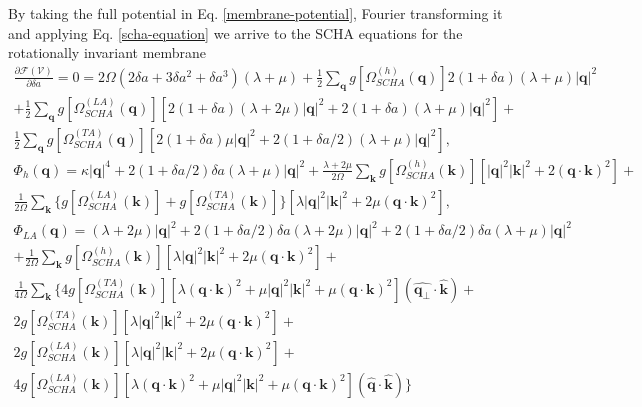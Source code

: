 By taking the full potential in Eq. \ref{membrane-potential}, Fourier transforming it and applying 
Eq. \ref{scha-equation} we arrive to the SCHA equations for the rotationally invariant membrane
\begin{multline}
 \frac{\partial\mathcal{F}(\mathcal{V})}{\partial\delta a}=0=2\Omega(2\delta a+3\delta a^{2}+\delta a^{3})(\lambda+
\mu)+\frac{1}{2}\sum_{\boldsymbol{q}}g[\Omega_{SCHA}^{(h)}(\boldsymbol{q})]2(1+\delta a)(\lambda+\mu)|\boldsymbol{
 q}|^{2}\\+\frac{1}{2}\sum_{\boldsymbol{q}}g[\Omega_{SCHA}^{(LA)}(\boldsymbol{q})][2(1+\delta a)(\lambda+2\mu)|\boldsymbol{q}|^{2}+2(1+\delta a)(\lambda+\mu)|\boldsymbol{q}|^{2}]+\\\frac{1}{2}\sum_{\boldsymbol{q}}g[\Omega_{
 SCHA}^{(TA)}(\boldsymbol{q})][2(1+\delta a)\mu|\boldsymbol{q}|^{2}+2(1+\delta a/2)(\lambda+\mu)|\boldsymbol{q}|^{2}],
\end{multline}
\begin{multline}
 \Phi_{h}(\boldsymbol{q})=\kappa|\boldsymbol{q}|^{4}+2(1+\delta a/2)\delta a(\lambda+\mu)|\boldsymbol{q}|^{2}+\frac{\lambda+2\mu}{2\Omega}\sum_{\boldsymbol{k}}g[\Omega_{SCHA}^{(h)}(\boldsymbol{k})][|\boldsymbol{q}|^{2}|\boldsymbol{
 k}|^{2}+2(\boldsymbol{q}\cdot\boldsymbol{k})^{2}]+\\\frac{1}{2\Omega}\sum_{\boldsymbol{k}}\{g[\Omega_{SCHA}^{(LA)}(\boldsymbol{k})]+g[\Omega_{SCHA}^{(TA)}(\boldsymbol{k})]\}[\lambda|\boldsymbol{q}|^{2}|\boldsymbol{k}|^{2}+2\mu(
 \boldsymbol{q}\cdot\boldsymbol{k})^{2}],
\end{multline}
\begin{multline}
 \Phi_{LA}(\boldsymbol{q})=(\lambda+2\mu)|\boldsymbol{q}|^{2}+2(1+\delta a/2)\delta a(\lambda+2\mu)|\boldsymbol{q}|^{2}+2(1+\delta a/2)\delta a(\lambda+\mu)|\boldsymbol{q}|^{2}\\+\frac{1}{2\Omega}\sum_{\boldsymbol{k}}g[\Omega_{SCHA}^{
 (h)}(\boldsymbol{k})][\lambda|\boldsymbol{q}|^{2}|\boldsymbol{k}|^{2}+2\mu(\boldsymbol{q}\cdot\boldsymbol{k})^{2}]+\\\frac{1}{4\Omega}\sum_{\boldsymbol{k}}\{4g[\Omega_{SCHA}^{(TA)}(\boldsymbol{k})][\lambda(\boldsymbol{q}\cdot\boldsymbol{
 k})^{2}+\mu|\boldsymbol{q}|^{2}|\boldsymbol{k}|^{2}+\mu(\boldsymbol{q}\cdot\boldsymbol{k})^{2}](\hat{\boldsymbol{q}_{\perp}}\cdot\hat{\boldsymbol{k}})+ \\ 2g[\Omega_{SCHA}^{(TA)}(\boldsymbol{k})][\lambda|\boldsymbol{q}|^{2}|\boldsymbol{
 k}|^{2}+2\mu(\boldsymbol{q}\cdot\boldsymbol{k})^{2}]+ \\ 2g[\Omega_{SCHA}^{(LA)}(\boldsymbol{k})][\lambda|\boldsymbol{q}|^{2}|\boldsymbol{k}|^{2}+2\mu(\boldsymbol{q}\cdot\boldsymbol{k})^{2}]+ \\ 4g[\Omega_{SCHA}^{(LA)}(\boldsymbol{
 k})][\lambda(\boldsymbol{q}\cdot\boldsymbol{k})^{2}+\mu|\boldsymbol{q}|^{2}|\boldsymbol{k}|^{2}+\mu(\boldsymbol{q}\cdot\boldsymbol{k})^{2}](\hat{\boldsymbol{q}}\cdot\hat{\boldsymbol{k}})\}
\end{multline}
